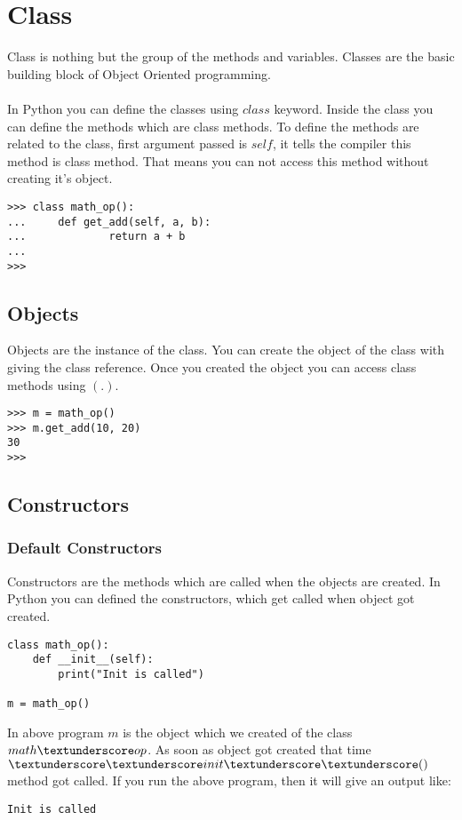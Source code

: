 \documentclass[letterpaper,12pt]{book}
\begin{document}
\section{Class}
Class is nothing but the group of the methods and variables. Classes are the basic building block of Object Oriented programming.
\paragraph{}
In Python you can define the classes using $class$ keyword. Inside the class you can define the methods which are class methods. To define the methods are related to the class, first argument passed is $self$, it tells the compiler this method is class method. That means you can not access this method without creating it's object.

\begin{lstlisting}
>>> class math_op():
...     def get_add(self, a, b):
...             return a + b
... 
>>> 
\end{lstlisting}
\subsection{Objects}
Objects are the instance of the class. You can create the object of the class with giving the class reference. Once you created the object you can access class methods using $(.)$.

\begin{lstlisting}
>>> m = math_op()
>>> m.get_add(10, 20)
30
>>>
\end{lstlisting}
\subsection{Constructors}
\subsubsection{Default Constructors}
Constructors are the methods which are called when the objects are created. In Python you can defined the constructors, which get called when object got created.

\begin{lstlisting}
class math_op():
    def __init__(self):
        print("Init is called")

m = math_op()
\end{lstlisting}
In above program $m$ is the object which we created of the class $math \textunderscore op$. As soon as object got created that time $\textunderscore\textunderscore init\textunderscore\textunderscore()$ method got called.
If you run the above program, then it will give an output like:
\begin{lstlisting}
Init is called
\end{lstlisting}
\end{document}
